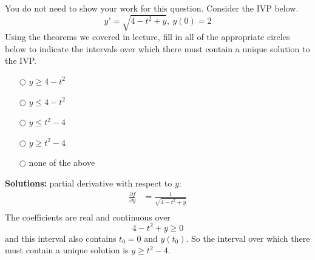 \ifnum {}
\question[1] You do not need to show your work for this question. Consider the IVP below.
$$\displaystyle y' = \sqrt{4-t^2+y}, \ y(0) = 2$$   
Using the theorems we covered in lecture, fill in all of the appropriate circles below to indicate the intervals over which there must contain a unique solution to the IVP. 
\begin{itemize}
    \item[$\bigcirc$] $y \ge 4-t^2$
    \item[$\bigcirc$] $y \le 4-t^2$
    \item[$\bigcirc$] $y \le t^2-4$
    \item[$\bigcirc$] $y \ge t^2-4$
    \item[$\bigcirc$] none of the above
\end{itemize}
\ifnum {} {\color{DarkBlue} 
\textbf{Solutions:} partial derivative with respect to $y$:
\begin{align}
    \frac{\partial f}{\partial y} &= \frac{1}{\sqrt{4-t^2+y}}\\
\end{align}
The coefficients are real and continuous over $$4-t^2+y\ge 0$$ and this interval also contains $t_0 = 0$ and $y(t_0)$. So the interval over which there must contain a unique solution is $y \ge t^2-4$. 
} 
\else 
\fi
\fi 



